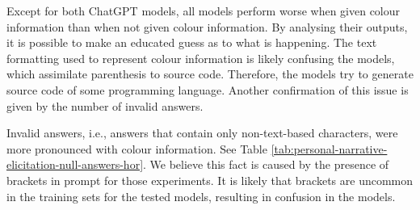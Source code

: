 Except for both ChatGPT models, all models perform worse when given colour information than when not given colour information. By analysing their outputs, it is possible to make an educated guess as to what is happening. The text formatting used to represent colour information is likely confusing the models, which assimilate parenthesis to source code. Therefore, the models try to generate source code of some programming language. Another confirmation of this issue is given by the number of invalid answers. 

Invalid answers, i.e., answers that contain only non-text-based characters, were more pronounced with colour information. See Table \ref{tab:personal-narrative-elicitation-null-answers-hor}.
 We believe this fact is caused by the presence of brackets in prompt for those experiments. It is likely that brackets are uncommon in the training sets for the tested models, resulting in confusion in the models.

